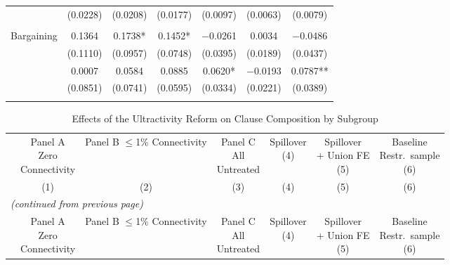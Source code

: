 \documentclass[12pt,letterpaper]{article}
\begin{document}
\begin{longtable}{l cccccc}
  & (0.0228) & (0.0208) & (0.0177) & (0.0097) & (0.0063) & (0.0079) \\
 & & & & & & \\
\quad Bargaining & 0.1364 & 0.1738* & 0.1452* & $-$0.0261 & 0.0034 & $-$0.0486 \\
  & (0.1110) & (0.0957) & (0.0748) & (0.0395) & (0.0189) & (0.0437) \\
  & 0.0007 & 0.0584 & 0.0885 & 0.0620* & $-$0.0193 & 0.0787** \\
  & (0.0851) & (0.0741) & (0.0595) & (0.0334) & (0.0221) & (0.0389) \\
 & & & & & & \\
\end{longtable}
\clearpage

\scriptsize
\begin{longtable}{l cccccc}
\caption{Effects of the Ultractivity Reform on Clause Composition by Subgroup} \label{tab:subgroup_shares} \\
\toprule\toprule
 & \shortstack{Panel A\\Zero\\Connectivity} & \shortstack{Panel B\\$\leq$1\%\\Connectivity} & \shortstack{Panel C\\All\\Untreated} & \shortstack{Spillover\\(4)} & \shortstack{Spillover\\+ Union FE\\(5)} & \shortstack{Baseline\\Restr.\ sample\\(6)} \\
 & (1) & (2) & (3) & (4) & (5) & (6) \\
\midrule
\endfirsthead
\multicolumn{7}{l}{\small\textit{(continued from previous page)}} \\
\toprule\toprule
 & \shortstack{Panel A\\Zero\\Connectivity} & \shortstack{Panel B\\$\leq$1\%\\Connectivity} & \shortstack{Panel C\\All\\Untreated} & \shortstack{Spillover\\(4)} & \shortstack{Spillover\\+ Union FE\\(5)} & \shortstack{Baseline\\Restr.\ sample\\(6)} \\

\end{longtable}
\end{document}
